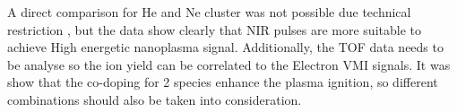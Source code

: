 A direct comparison for He and Ne cluster was not possible due technical restriction , but the data show clearly that NIR pulses are more suitable to achieve High energetic nanoplasma signal. Additionally, the TOF  data needs to be analyse so the ion yield can be correlated to the Electron VMI signals. It was show that the co-doping for 2 species enhance the plasma ignition, so different combinations should also be taken into consideration.  